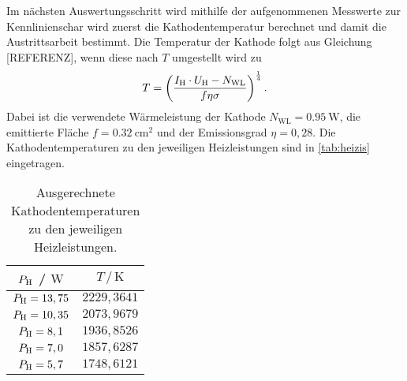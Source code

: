Im nächsten Auswertungsschritt wird mithilfe der aufgenommenen Messwerte zur Kennlinienschar wird zuerst die Kathodentemperatur berechnet und damit
die Austrittsarbeit bestimmt.
Die Temperatur der Kathode folgt aus Gleichung [REFERENZ], wenn diese nach $T$ umgestellt wird zu 
\begin{align}
  T = \left(\frac{I_{\text H}\cdot U_{\text H} - N_{\text{WL}}}{f\eta\sigma}\right)^{\frac 14}.
\end{align}
Dabei ist die verwendete Wärmeleistung der Kathode $N_{\text{WL}} = \SI{0,95}{\watt}$, die emittierte Fläche $f=\SI{0,32}{\centi\meter\squared}$
und der Emissionsgrad $\eta = 0,28$. Die Kathodentemperaturen zu den jeweiligen Heizleistungen sind in \autoref{tab:heizis} eingetragen.

\begin{table}[H]
  \caption{Ausgerechnete Kathodentemperaturen zu den jeweiligen Heizleistungen.}
  \label{tab:heizis}
  \centering
  \begin{tabular}{c c}
      \toprule
      $P_{\text H}$ / $\si{\watt}$ & $T \,/\, \si{\kelvin}$\\
      \midrule
      $P_{\text H} = 13,75$ & $2229,3641$ \\
      $P_{\text H} = 10,35$ & $2073,9679$ \\
      $P_{\text H} = 8,1$ & $1936,8526$ \\
      $P_{\text H} = 7,0$ & $1857,6287$ \\
      $P_{\text H} = 5,7$ & $1748,6121$ \\
      \bottomrule
    \end{tabular}
\end{table}